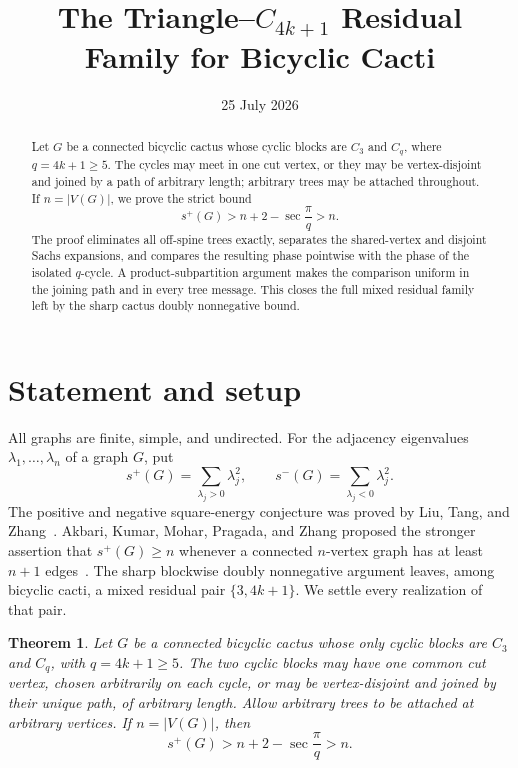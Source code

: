 \documentclass[11pt]{article}
\title{The Triangle--$C_{4k+1}$ Residual Family for Bicyclic Cacti}
\author{}
\date{25 July 2026}
\newtheorem{theorem}{Theorem}[section]
\theoremstyle{remark}
\begin{document}
\maketitle

\begin{abstract}
Let $G$ be a connected bicyclic cactus whose cyclic blocks are $C_3$ and
$C_q$, where $q=4k+1\geq5$.  The cycles may meet in one cut vertex, or they
may be vertex-disjoint and joined by a path of arbitrary length; arbitrary
trees may be attached throughout.  If $n=|V(G)|$, we prove the strict bound
\[
 s^+(G)>n+2-\sec\frac{\pi}{q}>n.
\]
The proof eliminates all off-spine trees exactly, separates the shared-vertex
and disjoint Sachs expansions, and compares the resulting phase pointwise
with the phase of the isolated $q$-cycle.  A product-subpartition argument
makes the comparison uniform in the joining path and in every tree message.
This closes the full mixed residual family left by the sharp cactus doubly
nonnegative bound.
\end{abstract}

\section{Statement and setup}

All graphs are finite, simple, and undirected.  For the adjacency eigenvalues
$\lambda_1,\ldots,\lambda_n$ of a graph $G$, put
\[
 s^+(G)=\sum_{\lambda_j>0}\lambda_j^2,
 \qquad
 s^-(G)=\sum_{\lambda_j<0}\lambda_j^2.
\]
The positive and negative square-energy conjecture was proved by Liu, Tang,
and Zhang~\cite{LTZ}.  Akbari, Kumar, Mohar, Pragada, and Zhang proposed the
stronger assertion that $s^+(G)\geq n$ whenever a connected $n$-vertex graph
has at least $n+1$ edges~\cite{AKMPZ}.  The sharp blockwise doubly
nonnegative argument leaves, among bicyclic cacti, a mixed residual pair
$\{3,4k+1\}$.  We settle every realization of that pair.

\begin{theorem}\label{thm:main}
Let $G$ be a connected bicyclic cactus whose only cyclic blocks are $C_3$ and
$C_q$, with $q=4k+1\geq5$.  The two cyclic blocks may have one common cut
vertex, chosen arbitrarily on each cycle, or may be vertex-disjoint and joined
by their unique path, of arbitrary length.  Allow arbitrary trees to be
attached at arbitrary vertices.  If $n=|V(G)|$, then
\begin{equation}\label{eq:main}
 s^+(G)>n+2-\sec\frac{\pi}{q}>n.
\end{equation}
\end{theorem}
\end{document}
